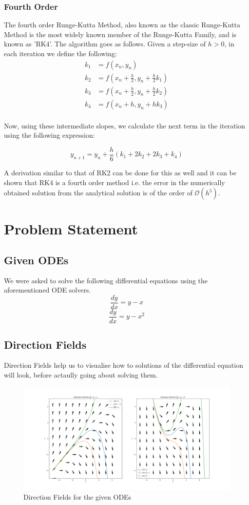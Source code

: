 \documentclass{scrartcl}
\begin{document}
\subsubsection{Fourth Order}
The fourth order Runge-Kutta Method, also known as the classic Runge-Kutta Method is the most widely known member of the Runge-Kutta Family, and is known as 'RK4'. The algorithm goes as follows. Given a step-size of $h > 0$, in each iteration we define the following:
\begin{align*}
    k_1 &= f(x_n, y_n) \\    
    k_2 &= f\left(x_n + \frac{h}{2}, y_n + \frac{h}{2}k_1\right) \\
    k_3 &= f\left(x_n + \frac{h}{2}, y_n + \frac{h}{2}k_2\right) \\
    k_4 &= f\left(x_n + h, y_n + hk_3\right) \\
\end{align*}

Now, using these intermediate slopes, we calculate the next term in the iteration using the following expression:

$$\boxed{y_{n + 1} = y_n + \frac{h}{6}(k_1 + 2k_2 + 2k_3 + k_4)}$$

A derivation similar to that of RK2 can be done for this as well and it can be shown that RK4 is a fourth order method i.e. the error in the numerically obtained solution from the analytical solution is of the order of $\mathcal{O}(h^5)$.

\section{Problem Statement}
\subsection{Given ODEs}
We were asked to solve the following differential equations using the aforementioned ODE solvers.
$$\frac{dy}{dx} = y - x$$
$$\frac{dy}{dx} = y - x^2$$

\subsection{Direction Fields}
Direction Fields help us to visualise how to solutions of the differential equation will look, before actaully going about solving them.
\begin{figure}[h]
    \centering
    \includegraphics[width=\linewidth]{"direction_fields.png"}
    \caption{Direction Fields for the given ODEs}
\end{figure}
\end{document}
